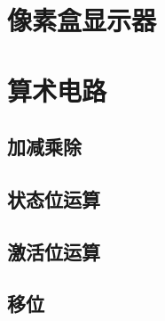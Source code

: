 \section{像素盒显示器}

\section{算术电路}
\subsection{加减乘除}
\subsection{状态位运算}
\subsection{激活位运算}
\subsection{移位}
